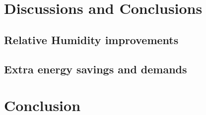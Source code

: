 \documentclass[review]{elsarticle}
\begin{document}
\section{Discussions and Conclusions}
    \subsection{Relative Humidity improvements}
    
    \subsection{Extra energy savings and demands}
    
\section{Conclusion}


\end{document}

